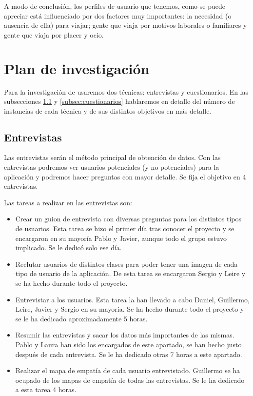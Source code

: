 A modo de conclusión, los perfiles de usuario que tenemos, como se puede apreciar está influenciado por dos factores muy importantes: la necesidad (o ausencia de ella) para viajar; gente que viaja por motivos laborales o familiares y gente que viaja por placer y ocio.

\section{Plan de investigación}

Para la investigación de \textit{\app} usaremos dos técnicas: entrevistas y cuestionarios. En las subsecciones \ref{subsec:entrevistas} y \ref{subsec:cuestionarios} hablaremos en detalle del número de instancias de cada técnica y de sus distintos objetivos en más detalle.

\subsection{Entrevistas} \label{subsec:entrevistas}

Las entrevistas serán el método principal de obtención de datos. Con las entrevistas podremos ver usuarios potenciales (y no potenciales) para la aplicación y podremos hacer preguntas con mayor detalle. Se fija el objetivo en 4 entrevistas.

Las tareas a realizar en las entrevistas son:
\begin{itemize}
    \item Crear un guion de entrevista con diversas preguntas para los distintos tipos de usuarios. Esta tarea se hizo el primer día tras conocer el proyecto y se encargaron en su mayoría Pablo y Javier, aunque todo el grupo estuvo implicado. Se le dedicó solo ese día.
    \item Reclutar usuarios de distintos clases para poder tener una imagen de cada tipo de usuario de la aplicación. De esta tarea se encargaron Sergio y Leire y se ha hecho durante todo el proyecto.
    \item Entrevistar a los usuarios. Esta tarea la han llevado a cabo Daniel, Guillermo, Leire, Javier y Sergio en su mayoría. Se ha hecho durante todo el proyecto y se le ha dedicado aproximadamente 5 horas.
    \item Resumir las entrevistas y sacar los datos más importantes de las mismas. Pablo y Laura han sido los encargados de este apartado, se han hecho justo después de cada entrevista. Se le ha dedicado otras 7 horas a este apartado.
    \item Realizar el mapa de empatía de cada usuario entrevistado. Guillermo se ha ocupado de los mapas de empatía de todas las entrevistas. Se le ha dedicado a esta tarea 4 horas.
\end{itemize}

